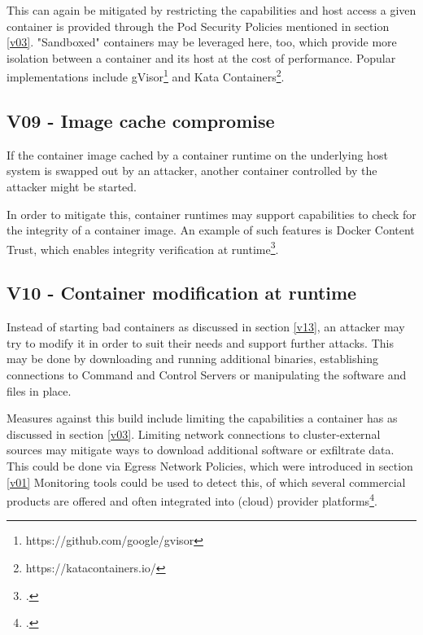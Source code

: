This can again be mitigated by restricting the capabilities and host access a given container is provided through the Pod Security Policies mentioned in section \ref{v03}.
"Sandboxed" containers may be leveraged here, too, which provide more isolation between a container and its host at the cost of performance. Popular implementations include gVisor\footnote{https://github.com/google/gvisor} and Kata Containers\footnote{https://katacontainers.io/}.

\subsection{V09 - Image cache compromise}
If the container image cached by a container runtime on the underlying host system is swapped out by an attacker, another container controlled by the attacker might be started.

In order to mitigate this, container runtimes may support capabilities to check for the integrity of a container image. An example of such features is Docker Content Trust, which enables integrity verification at runtime\footcite[][, section 'About Docker Content Trust (DCT)']{dockerContentTrust}.

\subsection{V10 - Container modification at runtime} \label{v10}
Instead of starting bad containers as discussed in section \ref{v13}, an attacker may try to modify it in order to suit their needs and support further attacks.
This may be done by downloading and running additional binaries, establishing connections to Command and Control Servers or manipulating the software and files in place.

Measures against this build include limiting the capabilities a container has as discussed in section \ref{v03}. Limiting network connections to cluster-external sources may mitigate ways to download additional software or exfiltrate data. This could be done via Egress Network Policies, which were introduced in section \ref{v01}
Monitoring tools could be used to detect this, of which several commercial products are offered and often integrated into (cloud) provider platforms\footcite[][, slide 40 to 41]{runtimeProt}.

